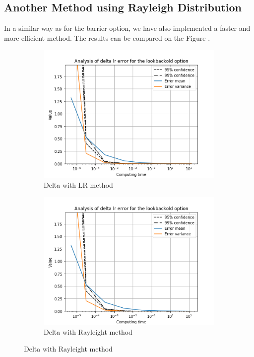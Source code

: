 \documentclass[11pt,a4paper,fleqn,draft]{article}
\begin{document}
\subsection{Another Method using Rayleigh Distribution}
 In a similar way as for the barrier option, we have also implemented a faster and more efficient method. The results can be compared on the Figure \cite{fig:lboptiongraphs}.

 \begin{figure}[h!]
   \centering
      \begin{subfigure}[b]{0.45\textwidth}
           \includegraphics[width=\textwidth]{graphs/lookbackolddeltalrtime.png}
           \caption{Delta with LR method}
       \end{subfigure}
       \begin{subfigure}[b]{0.45\textwidth}
           \includegraphics[width=\textwidth]{graphs/lookbackolddeltalrtime.png}
           \caption{Delta with Rayleight method}
       \end{subfigure}


\end{figure}
\end{document}
